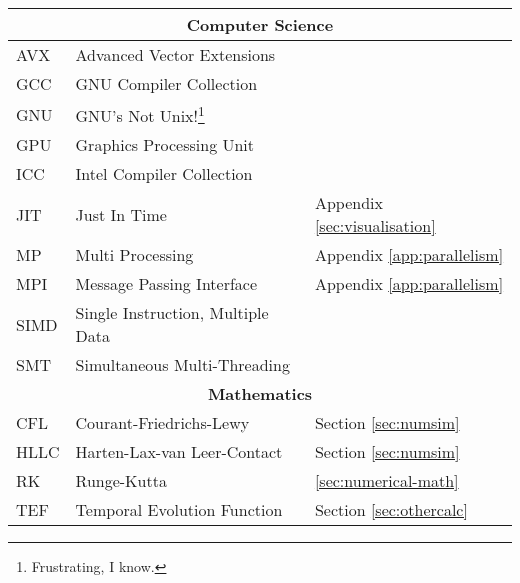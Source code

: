 \begin{abbreviations}
\begin{longtable}[c]{lll}
  \hline
  \multicolumn{3}{c}{\textbf{Computer Science}} \\
  \hline

  AVX  & Advanced Vector Extensions & \\
  GCC  & GNU Compiler Collection & \\
  GNU  & GNU's Not Unix!\footnote{Frustrating, I know.} & \\
  GPU  & Graphics Processing Unit & \\
  ICC  & Intel Compiler Collection & \\
  JIT  & Just In Time & Appendix \ref{sec:visualisation} \\
  MP   & Multi Processing & Appendix \ref{app:parallelism} \\
  MPI  & Message Passing Interface & Appendix \ref{app:parallelism} \\
  SIMD & Single Instruction, Multiple Data & \\
  SMT  & Simultaneous Multi-Threading & \\

  \hline
  \multicolumn{3}{c}{\textbf{Mathematics}} \\
  \hline

  CFL  & Courant-Friedrichs-Lewy & Section \ref{sec:numsim} \\
  HLLC & Harten-Lax-van Leer-Contact & Section \ref{sec:numsim} \\
  RK   & Runge-Kutta & \ref{sec:numerical-math} \\
  TEF & Temporal Evolution Function & Section \ref{sec:othercalc} \\

\end{longtable}
\end{abbreviations}
